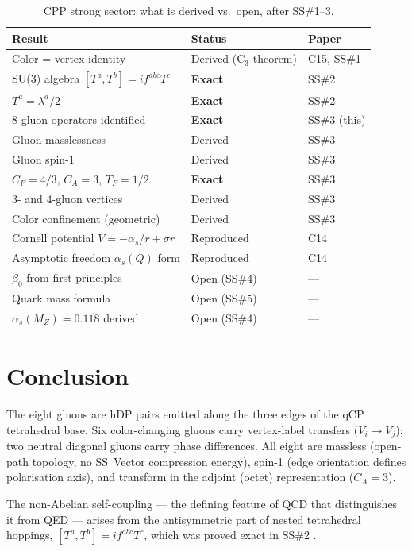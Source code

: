 \documentclass[11pt,a4paper]{article}
\newcommand{\as}{\alpha_s}
\begin{document}
\begin{table}[H]
\centering
\caption{CPP strong sector: what is derived vs.\ open, after SS\#1--3.}
\label{tab:status}
\begin{tabular}{@{}lll@{}}
\toprule
Result & Status & Paper \\
\midrule
Color = vertex identity & Derived (C$_3$ theorem) & C15, SS\#1 \\
SU(3) algebra $[T^a,T^b]=if^{abc}T^c$ & \textbf{Exact} & SS\#2 \\
$T^a = \lambda^a/2$ & \textbf{Exact} & SS\#2 \\
8 gluon operators identified & \textbf{Exact} & SS\#3 (this) \\
Gluon masslessness & Derived & SS\#3 \\
Gluon spin-1 & Derived & SS\#3 \\
$C_F = 4/3$, $C_A = 3$, $T_F = 1/2$ & \textbf{Exact} & SS\#3 \\
3- and 4-gluon vertices & Derived & SS\#3 \\
Color confinement (geometric) & Derived & SS\#3 \\
Cornell potential $V = -\as/r + \sigma r$ & Reproduced & C14 \\
Asymptotic freedom $\as(Q)$ form & Reproduced & C14 \\
$\beta_0$ from first principles & Open (SS\#4) & --- \\
Quark mass formula & Open (SS\#5) & --- \\
$\as(M_Z) = 0.118$ derived & Open (SS\#4) & --- \\
\bottomrule
\end{tabular}
\end{table}

\section{Conclusion}

The eight gluons are hDP pairs emitted along the three edges
of the qCP tetrahedral base.  Six color-changing gluons carry
vertex-label transfers ($V_i \to V_j$); two neutral diagonal
gluons carry phase differences.  All eight are massless (open-path
topology, no SS~Vector compression energy), spin-1 (edge orientation
defines polarisation axis), and transform in the adjoint (octet)
representation ($C_A = 3$).

The non-Abelian self-coupling --- the defining feature of
QCD that distinguishes it from QED --- arises from the
antisymmetric part of nested tetrahedral hoppings,
$[T^a, T^b] = if^{abc}T^c$, which was proved exact in
SS\#2 \citep{cpp_ss2}.
\end{document}
